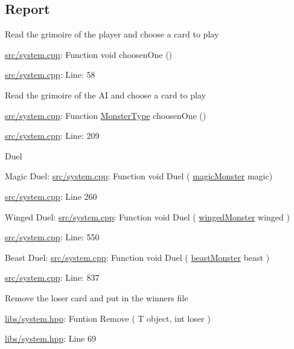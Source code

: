 \subsection*{Report}


\begin{DoxyItemize}
\item Read the grimoire of the player and choose a card to play

\hyperlink{system_8cpp}{src/system.\+cpp}\+: Function void choosen\+One ()

\hyperlink{system_8cpp}{src/system.\+cpp}\+: Line\+: 58
\item Read the grimoire of the AI and choose a card to play

\hyperlink{system_8cpp}{src/system.\+cpp}\+: Function \hyperlink{classMonsterType}{Monster\+Type} choosen\+One ()

\hyperlink{system_8cpp}{src/system.\+cpp}\+: Line\+: 209
\item Duel

Magic Duel\+: \hyperlink{system_8cpp}{src/system.\+cpp}\+: Function void Duel ( \hyperlink{classmagicMonster}{magic\+Monster} magic)

\hyperlink{system_8cpp}{src/system.\+cpp}\+: Line 260

Winged Duel\+: \hyperlink{system_8cpp}{src/system.\+cpp}\+: Function void Duel ( \hyperlink{classwingedMonster}{winged\+Monster} winged )

\hyperlink{system_8cpp}{src/system.\+cpp}\+: Line\+: 550

Beast Duel\+: \hyperlink{system_8cpp}{src/system.\+cpp}\+: Function void Duel ( \hyperlink{classbeastMonster}{beast\+Monster} beast )

\hyperlink{system_8cpp}{src/system.\+cpp}\+: Line\+: 837
\item Remove the loser card and put in the winner\textquotesingle{}s file

\hyperlink{system_8hpp}{libs/system.\+hpp}\+: Funtion Remove ( T object, int loser )

\hyperlink{system_8hpp}{libs/system.\+hpp}\+: Line 69 
\end{DoxyItemize}